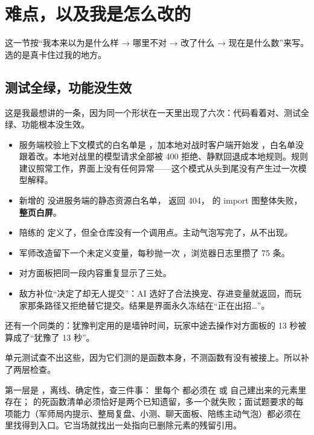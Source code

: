 \section{难点，以及我是怎么改的}

这一节按“我本来以为是什么样 → 哪里不对 → 改了什么 → 现在是什么数”来写。选的是真卡住过我的地方。

\subsection{测试全绿，功能没生效}

这是我最想讲的一条，因为同一个形状在一天里出现了六次：代码看着对、测试全绿、功能根本没生效。

\begin{itemize}[leftmargin=1.6em,itemsep=0.25em,topsep=0.3em]
\item 服务端校验上下文模式的白名单是 ，加本地对战时客户端开始发 ，白名单没跟着改。本地对战里的模型请求全部被 400 拒绝、静默回退成本地规则。规则建议照常工作，界面上没有任何异常——这个模式从头到尾没有产生过一次模型解释。
\item 新增的  没进服务端的静态资源白名单， 返回 404， 的 import 图整体失败，\textbf{整页白屏}。
\item 陪练的  定义了，但全仓库没有一个调用点。主动气泡写完了，从不出现。
\item 军师改造留下一个未定义变量，每秒抛一次 ，浏览器日志里攒了 75 条。
\item 对方面板把同一段内容重复显示了三处。
\item 敌方补位“决定了却无人提交”：AI 选好了合法换宠、存进变量就返回，而玩家那条路径又拒绝替它提交。结果是界面永久冻结在“正在出招…”。
\end{itemize}

还有一个同类的：犹豫判定用的是墙钟时间，玩家中途去操作对方面板的 13 秒被算成了“犹豫了 13 秒”。

单元测试查不出这些，因为它们测的是函数本身，不测函数有没有被接上。所以补了两层检查。

第一层是 ，离线、确定性，查三件事： 里每个  都必须在  或  自己建出来的元素里存在； 的死函数清单必须恰好是两个已知遗留，多一个就失败；面试题要求的每项能力（军师局内提示、整局复盘、小测、聊天面板、陪练主动气泡）都必须在  里找得到入口。它当场就找出一处指向已删除元素的残留引用。

